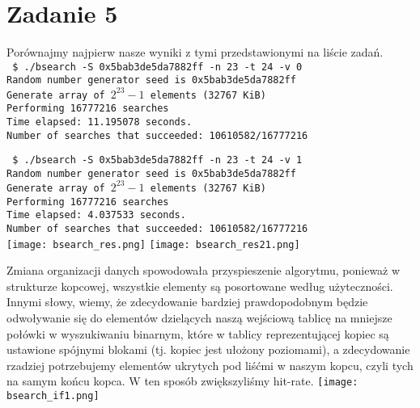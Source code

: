 \documentclass[10pt,wide]{mwart}
\begin{document}
 \section{Zadanie 5}
 Porównajmy najpierw nasze wyniki z tymi przedstawionymi na liście zadań. \\
 \texttt{
         \$ ./bsearch -S 0x5bab3de5da7882ff -n 23 -t 24 -v 0 \\
         Random number generator seed is 0x5bab3de5da7882ff \\
         Generate array of $2^{23}-1$ elements (32767 KiB) \\ %
         Performing 16777216 searches \\
         Time elapsed: 11.195078 seconds. \\
         Number of searches that succeeded: 10610582/16777216 \\
         }

 \texttt{
         \$ ./bsearch -S 0x5bab3de5da7882ff -n 23 -t 24 -v 1 \\
         Random number generator seed is 0x5bab3de5da7882ff \\
         Generate array of $2^{23}-1$ elements (32767 KiB) \\
         Performing 16777216 searches \\
         Time elapsed: 4.037533 seconds.\\
         Number of searches that succeeded: 10610582/16777216 \\
 }
\texttt{[image: bsearch\_res.png]}
\texttt{[image: bsearch\_res21.png]}


 Zmiana organizacji danych spowodowała przyspieszenie algorytmu, ponieważ w strukturze kopcowej, wszystkie elementy są posortowane według użyteczności. Innymi słowy, wiemy, że zdecydowanie
 bardziej prawdopodobnym będzie odwoływanie się do elementów dzielących naszą wejściową tablicę na mniejsze połówki w wyszukiwaniu binarnym, które
 w tablicy reprezentującej kopiec są ustawione spójnymi blokami (tj. kopiec jest ułożony poziomami),
 a zdecydowanie rzadziej potrzebujemy elementów ukrytych pod liśćmi w naszym kopcu, czyli tych na samym końcu kopca. W ten sposób zwiększyliśmy hit-rate.
 \texttt{[image: bsearch\_if1.png]}
\end{document}
